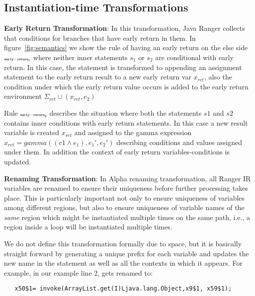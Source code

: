 \subsection{Instantiation-time Transformations}
\label{sec:instantiationTransformations}

\textbf{Early Return Transformation}: In this transformation, Java Ranger collects that conditions for branches that have early return in them. In figure~\ref{fig:semantics} we show the rule of having an early return on the else side $\scriptscriptstyle\mathtt{early-return_1}$ where neither inner statements $s_1$ or $s_2$ are conditional with early return. In this case, the statement is transformed to appending an assignment statement to the early return result to a new early return var $x_{ret}$, also the condition under which the early return value occurs is added to the early return environment $\Sigma_{ret} \cup (x_{ret}, e_2)$ 

Rule $\scriptscriptstyle\mathtt{early-return_2}$ describes the situation where both the statements $s1$ and $s2$ contains inner conditions with early return statements. In this case a new result variable is created $x_{ret}$ and assigned to the gamma expression $x_{ret} = gamma((c1 \wedge e_1), e_1',  e_2')$ describing conditions and values assigned under them. In addition the context of early return variables-conditions is updated. 

\textbf{Renaming Transformation}: In Alpha renaming transformation, all Ranger IR variables are renamed to ensure their uniqueness before further processing takes place. 
%
This is particularly important not only to ensure uniqueness of variables among different regions, but also to ensure
uniqueness of variable names of the \textit{same} region which might be instantiated multiple times on the same path,
i.e., a region inside a loop will be instantiated multiple times.

We do not define this transformation formally due to space, but it is basically straight forward by generating a unique prefix for each variable and updates the new name in the statement as well as all the contexts in which it appears.  For example, in our example line 2, gets renamed to:
\begin{lstlisting}
   x50$1= invoke(ArrayList.get(I)Ljava.lang.Object,x9$1, x59$1);
\end{lstlisting}

